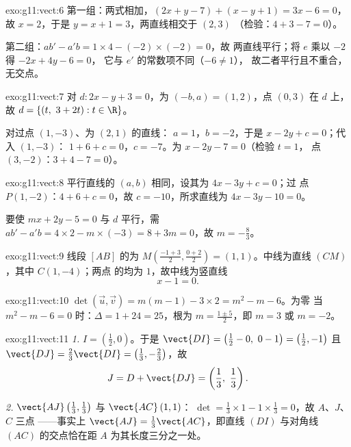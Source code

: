 \begin{solution}{exo:g11:vect:6}
第一组：两式相加，$(2x + y - 7) + (x - y + 1) =
3x - 6 = 0$，故 $x = 2$，于是 $y = x + 1 = 3$，两直线相交于 $(2, 3)$
（检验：$4 + 3 - 7 = 0$）。

第二组：$ab' - a'b = 1 \times 4 - (-2) \times (-2) = 0$，故
两直线平行；将 $e$ 乘以 $-2$ 得 $-2x + 4y - 6 = 0$，
它与 $e'$ 的常数项不同（$-6 \neq 1$），
故二者平行且不重合，无交点。
\end{solution}

\begin{solution}{exo:g11:vect:7}
对 $d: 2x - y + 3 = 0$，为 $(-b, a) = (1, 2)$，点
$(0, 3)$ 在 $d$ 上，故 $d = \{(t,\ 3 + 2t) : t \in \R\}$。

对过点 $(1, -3)$、为 $(2, 1)$ 的直线：
$a = 1$，$b = -2$，于是 $x - 2y + c = 0$；代入 $(1, -3)$：
$1 + 6 + c = 0$，$c = -7$。为 $x - 2y - 7 = 0$（检验 $t = 1$，
点 $(3, -2)$：$3 + 4 - 7 = 0$）。
\end{solution}

\begin{solution}{exo:g11:vect:8}
平行直线的 $(a, b)$ 相同，设其为 $4x - 3y + c = 0$；过
点 $P(1, -2)$：$4 + 6 + c = 0$，故 $c = -10$，所求直线为
$4x - 3y - 10 = 0$。

要使 $mx + 2y - 5 = 0$ 与 $d$ 平行，需
$ab' - a'b = 4 \times 2 - m \times (-3) = 8 + 3m = 0$，故
$m = -\frac83$。
\end{solution}

\begin{solution}{exo:g11:vect:9}
线段 $[AB]$ 的为 $M\!\left(\frac{-1+3}{2}, \frac{0+2}{2}\right)
= (1, 1)$。中线为直线 $(CM)$，其中 $C(1, -4)$；两点
的均为 $1$，故中线为竖直线
\[
x - 1 = 0 .
\]
\end{solution}

\begin{solution}{exo:g11:vect:10}
$\det(\vec u, \vec v) = m(m - 1) - 3 \times 2 = m^2 - m - 6$。为零
当 $m^2 - m - 6 = 0$ 时：$\Delta = 1 + 24 = 25$，根为
$m = \frac{1 \pm 5}{2}$，即 $m = 3$ 或 $m = -2$。
\end{solution}

\begin{solution}{exo:g11:vect:11}
\emph{1.} $I = \left(\frac12, 0\right)$。于是
$\vect{DI} = \left(\frac12 - 0,\ 0 - 1\right) = \left(\frac12, -1\right)$
且 $\vect{DJ} = \frac23\vect{DI} = \left(\frac13, -\frac23\right)$，故
\[
J = D + \vect{DJ} = \left(\frac13,\ \frac13\right).
\]

\emph{2.} $\vect{AJ}\left(\frac13, \frac13\right)$ 与
$\vect{AC}\,(1, 1)$：
$\det = \frac13 \times 1 - 1 \times \frac13 = 0$，故 $A$、$J$、$C$ 三点
——事实上 $\vect{AJ} = \frac13\vect{AC}$，即直线 $(DI)$
与对角线 $(AC)$ 的交点恰在距 $A$ 为其长度三分之一处。
\end{solution}

